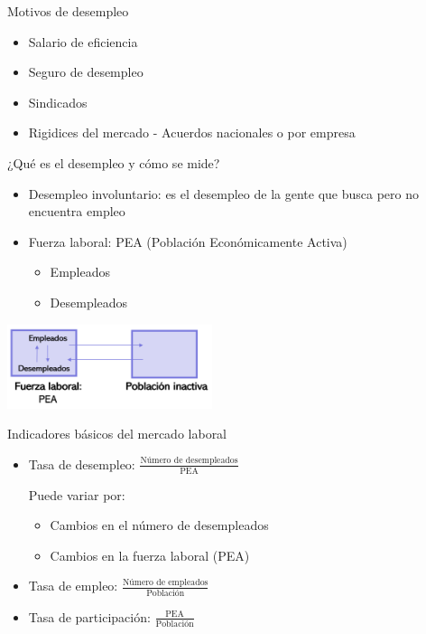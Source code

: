 \documentclass{beamer}
\newcommand\dangersignw[1][2ex]{%
  \scaleto{\stackengine{0.3pt}{\scalebox{1.1}[.9]{%
  \color{red}$\blacktriangle$}}{\color{white}\tiny\bfseries !}{O}{c}{F}{F}{L}}{#1}%
}
\begin{document}
\begin{frame}{Motivos de desempleo}

\begin{itemize}
    \item Salario de  eficiencia
    \item Seguro de desempleo
    \item Sindicados
    \item Rigidices del mercado - Acuerdos nacionales o por empresa    
\end{itemize}

\end{frame}



\begin{frame}{¿Qué es el desempleo y cómo se mide?}
\begin{itemize}
    \item Desempleo involuntario: es el desempleo de la gente que busca pero no encuentra empleo
    \item Fuerza laboral: PEA (Población Económicamente Activa)
        \begin{itemize}
            \item Empleados
            \item Desempleados
        \end{itemize}
\end{itemize}
\vspace{3mm}
\centering\includegraphics[width=6cm]{Slides Principios de Economia/Figures/P32.png}\
\end{frame}

\begin{frame}{Indicadores básicos del mercado laboral}
\begin{itemize}
    \item Tasa de desempleo: $\frac{\text {Número de desempleados}}{\text{PEA}}$
    \vspace{3mm}
    
        \dangersignw Puede variar por: 
        \begin{itemize}
            \vspace{2mm}
        \item Cambios en el número de desempleados
            \vspace{2mm}
        \item Cambios en la fuerza laboral (PEA)
        \end{itemize}
           \vspace{3mm}
    \item Tasa de empleo: $\frac{\text {Número de empleados}}{\text{Población}}$
    \vspace{3mm}
    \item Tasa de participación: $\frac{\text {PEA}}{\text{Población}}$
\end{itemize}
\end{frame}
\end{document}
